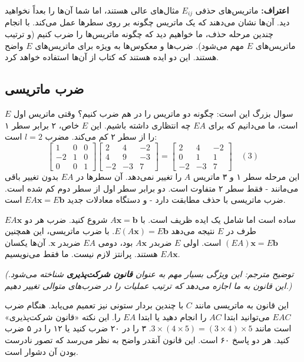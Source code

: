 \documentclass[12pt, a4paper]{book}
\begin{document}
	\textbf{اعتراف:} ماتریس‌های حذفی $E_{ij}$ مثال‌های عالی هستند، اما شما آن‌ها را بعداً نخواهید دید. آن‌ها نشان می‌دهند که یک ماتریس چگونه بر روی سطرها عمل می‌کند. با انجام چندین مرحله حذف، ما خواهیم دید که چگونه ماتریس‌ها را ضرب کنیم (و ترتیب ماتریس‌های $E$ مهم می‌شود). ضرب‌ها و معکوس‌ها به ویژه برای ماتریس‌های $E$ واضح هستند. این دو ایده هستند که کتاب از آن‌ها استفاده خواهد کرد.
	
	\subsection*{ضرب ماتریسی}
	سوال بزرگ این است: چگونه دو ماتریس را در هم ضرب کنیم؟ وقتی ماتریس اول $E$ است، ما می‌دانیم که برای $EA$ چه انتظاری داشته باشیم. این $E$ خاص، ۲ برابر سطر ۱ را از سطر ۲ کم می‌کند. مضرب $l=2$ است:
	\[
	\begin{bmatrix} 1 & 0 & 0 \\ -2 & 1 & 0 \\ 0 & 0 & 1 \end{bmatrix}
	\begin{bmatrix} 2 & 4 & -2 \\ 4 & 9 & -3 \\ -2 & -3 & 7 \end{bmatrix}
	=
	\begin{bmatrix} 2 & 4 & -2 \\ 0 & 1 & 1 \\ -2 & -3 & 7 \end{bmatrix} \quad (3)
	\]
	این مرحله سطر ۱ و ۳ ماتریس $A$ را تغییر نمی‌دهد. آن سطرها در $EA$ بدون تغییر باقی می‌مانند - فقط سطر ۲ متفاوت است. دو برابر سطر اول از سطر دوم کم شده است. ضرب ماتریسی با حذف مطابقت دارد - و دستگاه معادلات جدید $EA\mathbf{x} = E\mathbf{b}$ است.
	
	$EA\mathbf{x}$ ساده است اما شامل یک ایده ظریف است. با $A\mathbf{x}=\mathbf{b}$ شروع کنید. ضرب هر دو طرف در $E$ نتیجه می‌دهد $E(A\mathbf{x})=E\mathbf{b}$. با ضرب ماتریسی، این همچنین $(EA)\mathbf{x}=E\mathbf{b}$ است.
	اولی $E$ ضربدر $A\mathbf{x}$ بود، دومی $EA$ ضربدر $\mathbf{x}$. آن‌ها یکسان هستند.
	پرانتز لازم نیست. ما فقط می‌نویسیم $EA\mathbf{x}$.
	
	\textit{(توضیح مترجم: این ویژگی بسیار مهم به عنوان \textbf{قانون شرکت‌پذیری} شناخته می‌شود. این قانون به ما اجازه می‌دهد که ترتیب عملیات را در ضرب‌های متوالی تغییر دهیم.)}
	
	این قانون به ماتریسی مانند $C$ با چندین بردار ستونی نیز تعمیم می‌یابد. هنگام ضرب $EAC$ می‌توانید ابتدا $AC$ را انجام دهید یا ابتدا $EA$ را. این نکته «قانون شرکت‌پذیری» است مانند $3 \times (4 \times 5) = (3 \times 4) \times 5$. ۳ را در ۲۰ ضرب کنید یا ۱۲ را در ۵ ضرب کنید. هر دو پاسخ ۶۰ است. این قانون آنقدر واضح به نظر می‌رسد که تصور نادرست بودن آن دشوار است.
	
\end{document}
